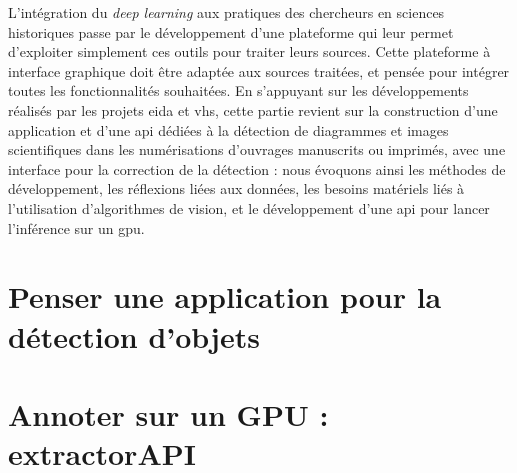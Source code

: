 \documentclass[a4paper,12pt,twoside]{book}
\newcommand{\api}{\gls{api}\xspace}
\newcommand{\eida}{\gls{eida}\xspace}
\newcommand{\gpu}{\gls{gpu}\xspace}
\newcommand{\vhs}{\gls{vhs}\xspace}
\begin{document}
        L'intégration du \textit{deep learning} aux pratiques des chercheurs en sciences historiques passe par le développement d'une plateforme qui leur permet d'exploiter simplement ces outils pour traiter leurs sources. Cette plateforme à interface graphique doit être adaptée aux sources traitées, et pensée pour intégrer toutes les fonctionnalités souhaitées. En s'appuyant sur les développements réalisés par les projets \eida et \vhs, cette partie revient sur la construction d'une application  et d'une \api dédiées à la détection de diagrammes et images scientifiques dans les numérisations d'ouvrages manuscrits ou imprimés, avec une interface pour la correction de la détection : nous évoquons ainsi les méthodes de développement, les réflexions liées aux données, les besoins matériels liés à l'utilisation d'algorithmes de vision, et le développement d'une \api pour lancer l'inférence sur un \gpu. 
         
                \section{Penser une application pour la détection d'objets}
                    
            
                \section{Annoter sur un GPU : extractorAPI}
                    
        \\
        
\end{document}
